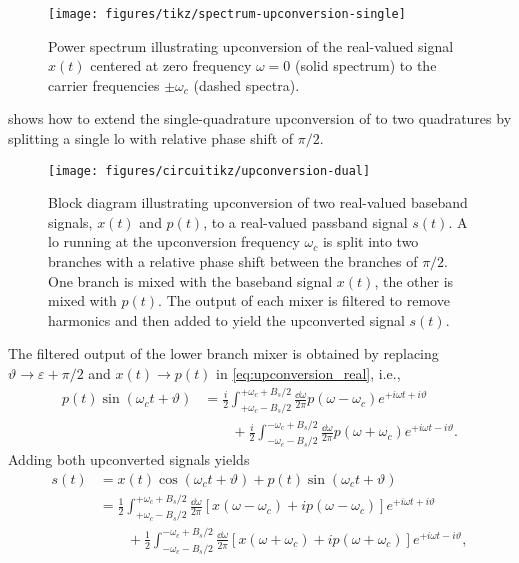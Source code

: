 \begin{figure}[htb]
	\centering
	\texttt{[image: figures/tikz/spectrum-upconversion-single]}
	\caption{Power spectrum illustrating upconversion of the real-valued signal $x(t)$ centered at zero frequency $\omega=0$ (solid spectrum) to the carrier frequencies $\pm\omega_c$ (dashed spectra).}\label{fig:spectrum_upconversion_single}
\end{figure}
 shows how to extend the single-quadrature upconversion of  to two quadratures by splitting a single \gls{lo} with relative phase shift of $\pi/2$.
\begin{figure}[htb]
	\centering
	\texttt{[image: figures/circuitikz/upconversion-dual]}
	\caption{Block diagram illustrating upconversion of two real-valued baseband signals, $x(t)$ and $p(t)$, to a real-valued passband signal $s(t)$. A \gls{lo} running at the upconversion frequency $\omega_c$ is split into two branches with a relative phase shift between the branches of $\pi/2$. One branch is mixed with the baseband signal $x(t)$, the other is mixed with $p(t)$. The output of each mixer is filtered to remove harmonics and then added to yield the upconverted signal $s(t)$.}\label{fig:upconversion_dual}
\end{figure}
The filtered output of the lower branch mixer is obtained by replacing $\vartheta\to\varepsilon+\pi/2$ and $x(t)\to p(t)$ in \cref{eq:upconversion_real}, i.e.,
\begin{equation}
	\begin{split}
		p(t)
		\sin(\omega_ct+\vartheta)
		&=
		\frac{i}{2}
		\int_{+\omega_c-B_s/2}^{+\omega_c+B_s/2}
		\frac{\dd{\omega}}{2\pi}
		p(\omega-\omega_c)
		e^{+i\omega t+i\vartheta}
		\\
		&\qquad+
		\frac{i}{2}
		\int_{-\omega_c-B_s/2}^{-\omega_c+B_s/2}
		\frac{\dd{\omega}}{2\pi}
		p(\omega+\omega_c)
		e^{+i\omega t-i\vartheta}
		.
	\end{split}
	\label{eq:upconversion_real}
\end{equation}
Adding both upconverted signals yields
\begin{equation}
	\begin{split}
		s(t)
		&=
		x(t)
		\cos(\omega_ct+\vartheta)
		+
		p(t)
		\sin(\omega_ct+\vartheta)
		\\
		&=
		\frac{1}{2}
		\int_{+\omega_c-B_s/2}^{+\omega_c+B_s/2}
		\frac{\dd{\omega}}{2\pi}
		\left[
			x(\omega-\omega_c)
			+
			ip(\omega-\omega_c)
		\right]
		e^{+i\omega t+i\vartheta}
		\\
		&\qquad+
		\frac{1}{2}
		\int_{-\omega_c-B_s/2}^{-\omega_c+B_s/2}
		\frac{\dd{\omega}}{2\pi}
		\left[
			x(\omega+\omega_c)
			+
			ip(\omega+\omega_c)
		\right]
		e^{+i\omega t-i\vartheta}
		,
	\end{split}
\end{equation}

